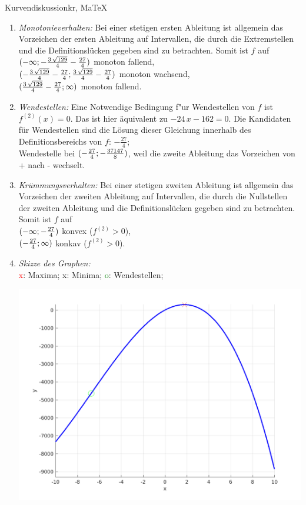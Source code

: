 \begin{MAufgabe}{Kurvendiskussion}{kr, MaTeX}
\begin{enumerate}
 \item \emph{Monotonieverhalten:} 
 Bei einer stetigen ersten Ableitung ist allgemein das Vorzeichen der ersten Ableitung auf Intervallen, die durch die Extremstellen und die Definitionsl\"ucken gegeben sind zu betrachten. Somit ist $f$ auf \\ 
 $(-\infty; - \frac{3\, \sqrt{129}}{4} - \frac{27}{4})$ monoton fallend, \\ 
 $( - \frac{3\, \sqrt{129}}{4} - \frac{27}{4};\frac{3\, \sqrt{129}}{4} - \frac{27}{4})$ monoton  wachsend, \\ 
 $(\frac{3\, \sqrt{129}}{4} - \frac{27}{4}; \infty)$ monoton fallend. \\ 
 \item \emph{Wendestellen:} 
 Eine Notwendige Bedingung f"ur Wendestellen von $f$ ist $f^{(2)}(x)=0$. 
 Das ist hier \"aquivalent zu $ - 24\, x - 162=0$. 
 Die Kandidaten f\"ur Wendestellen sind die L\"osung dieser Gleichung innerhalb des Definitionsbereichs von $f$: $- \frac{27}{4}$; \\ 
 Wendestelle bei $(- \frac{27}{4};- \frac{37147}{8})$, weil die zweite Ableitung das Vorzeichen von + nach - wechselt. \\ 
 \item \emph{Kr\"ummungsverhalten:} 
 Bei einer stetigen zweiten Ableitung ist allgemein das Vorzeichen der zweiten Ableitung auf Intervallen, die durch die Nullstellen der zweiten Ableitung und die Definitionsl\"ucken gegeben sind zu betrachten. 
 Somit ist $f$ auf \\ 
 $(-\infty ;- \frac{27}{4})$  konvex ($f^{(2)}>0$), \\ 
 $(- \frac{27}{4}; \infty)$  konkav ($f^{(2)}>0$). \\ 
 \item \emph{Skizze des Graphen:} \\ 
 {\textcolor{red} x}: Maxima; {\textcolor{black} x}: Minima; {\textcolor{green} o}: Wendestellen; 
  \begin{center}
  \includegraphics[width=0.8\linewidth]{Abb_zur_Ag_autogenerated_fractions_37.png} \end{center}
  
 \end{enumerate}
 \else\relax\fi
  \end{MAufgabe}